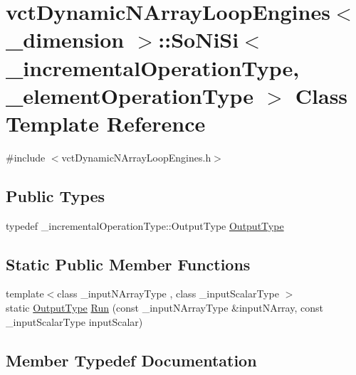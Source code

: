 \hypertarget{classvct_dynamic_n_array_loop_engines_1_1_so_ni_si}{}\section{vct\+Dynamic\+N\+Array\+Loop\+Engines$<$ \+\_\+dimension $>$\+:\+:So\+Ni\+Si$<$ \+\_\+incremental\+Operation\+Type, \+\_\+element\+Operation\+Type $>$ Class Template Reference}
\label{classvct_dynamic_n_array_loop_engines_1_1_so_ni_si}


{\ttfamily \#include $<$vct\+Dynamic\+N\+Array\+Loop\+Engines.\+h$>$}

\subsection*{Public Types}
\begin{DoxyCompactItemize}
\item 
typedef \+\_\+incremental\+Operation\+Type\+::\+Output\+Type \hyperlink{classvct_dynamic_n_array_loop_engines_1_1_so_ni_si_a6ccca4bbd5b212028da2432d517baa2d}{Output\+Type}
\end{DoxyCompactItemize}
\subsection*{Static Public Member Functions}
\begin{DoxyCompactItemize}
\item 
{\footnotesize template$<$class \+\_\+input\+N\+Array\+Type , class \+\_\+input\+Scalar\+Type $>$ }\\static \hyperlink{classvct_dynamic_n_array_loop_engines_1_1_so_ni_si_a6ccca4bbd5b212028da2432d517baa2d}{Output\+Type} \hyperlink{classvct_dynamic_n_array_loop_engines_1_1_so_ni_si_a3ae2384c2a48634260ad3d706d2ac4d8}{Run} (const \+\_\+input\+N\+Array\+Type \&input\+N\+Array, const \+\_\+input\+Scalar\+Type input\+Scalar)
\end{DoxyCompactItemize}


\subsection{Member Typedef Documentation}
\hypertarget{classvct_dynamic_n_array_loop_engines_1_1_so_ni_si_a6ccca4bbd5b212028da2432d517baa2d}{}
